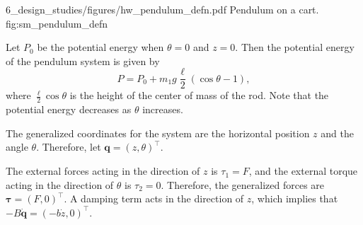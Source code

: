
	{6_design_studies/figures/hw_pendulum_defn.pdf}
	{Pendulum on a cart.}
	{fig:sm_pendulum_defn}
	


Let $P_0$ be the potential energy when $\theta=0$ and $z=0$.  Then the potential energy of the pendulum system is given by
\[
P = P_0 + m_1 g \frac{\ell}{2} (\cos\theta-1),
\]
where $\frac{\ell}{2}\cos\theta$ is the height of the center of mass of the rod.
Note that the potential energy decreases as $\theta$ increases.

The generalized coordinates for the system are the horizontal position $z$ and the angle $\theta$.  Therefore, let $\mathbf{q} = (z, \theta)^\top$.

The external forces acting in the direction of $z$ is $\tau_1 = F$, and the external torque acting in the direction of $\theta$ is $\tau_2=0$.  Therefore, the generalized forces are $\boldsymbol{\tau}=(F, 0)^\top$.  A damping term acts in the direction of $z$, which implies that
$-B\dot{\mathbf{q}} = (-b\dot{z}, 0)^\top$.

